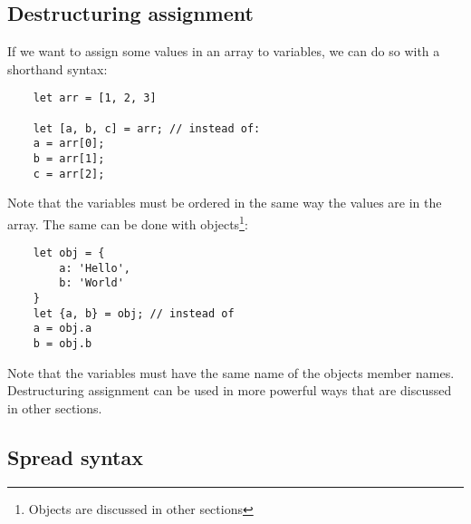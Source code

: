 \documentclass[11pt,a4paper]{article}
\begin{document}
\subsection{Destructuring assignment}
If we want to assign some values in an array to variables, we can do so with a shorthand syntax:
\begin{verbatim}
    let arr = [1, 2, 3]

    let [a, b, c] = arr; // instead of:
    a = arr[0];
    b = arr[1];
    c = arr[2];
\end{verbatim}
Note that the variables must be ordered in the same way the values are in the array.
The same can be done with objects\footnote{Objects are discussed in other sections}:
\begin{verbatim}
    let obj = {
        a: 'Hello',
        b: 'World'
    }
    let {a, b} = obj; // instead of
    a = obj.a
    b = obj.b
\end{verbatim}
Note that the variables must have the same name of the objects member names. Destructuring assignment can be used in more
powerful ways that are discussed in other sections.

\subsection{Spread syntax}
\end{document}
